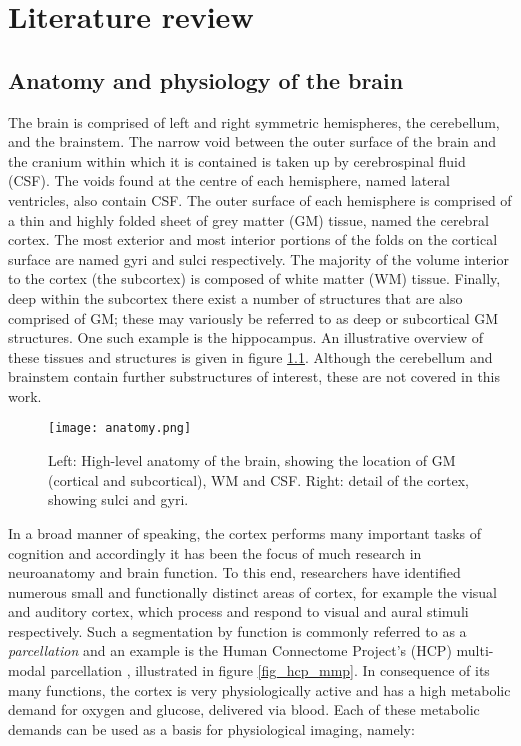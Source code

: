  

\chapter{Literature review}
\label{lit_review_chapter}

\section{Anatomy and physiology of the brain}

The brain is comprised of left and right symmetric hemispheres, the cerebellum, and the brainstem. The narrow void between the outer surface of the brain and the cranium within which it is contained is taken up by cerebrospinal fluid (CSF). The voids found at the centre of each hemisphere, named lateral ventricles, also contain CSF. The outer surface of each hemisphere is comprised of a thin and highly folded sheet of grey matter (GM) tissue, named the cerebral cortex. The most exterior and most interior portions of the folds on the cortical surface are named gyri and sulci respectively. The majority of the volume interior to the cortex (the subcortex) is composed of white matter (WM) tissue. Finally, deep within the subcortex there exist a number of structures that are also comprised of GM; these may variously be referred to as deep or subcortical GM structures. One such example is the hippocampus. An illustrative overview of these tissues and structures is given in figure \ref{anatomy}. Although the cerebellum and brainstem contain further substructures of interest, these are not covered in this work. 

\begin{figure}
\centering
\texttt{[image: anatomy.png]}
\caption{Left: High-level anatomy of the brain, showing the location of GM (cortical and subcortical), WM and CSF. Right: detail of the cortex, showing sulci and gyri.}
\label{anatomy}
\end{figure}

In a broad manner of speaking, the cortex performs many important tasks of cognition and accordingly it has been the focus of much research in neuroanatomy and brain function. To this end, researchers have identified numerous small and functionally distinct areas of cortex, for example the visual and auditory cortex, which process and respond to visual and aural stimuli respectively. Such a segmentation by function is commonly referred to as a \textit{parcellation} and an example is the Human Connectome Project's (HCP) multi-modal parcellation \cite{Glasser2016}, illustrated in figure \ref{fig_hcp_mmp}. In consequence of its many functions, the cortex is very physiologically active and has a high metabolic demand for oxygen and glucose, delivered via blood. Each of these metabolic demands can be used as a basis for physiological imaging, namely: 

